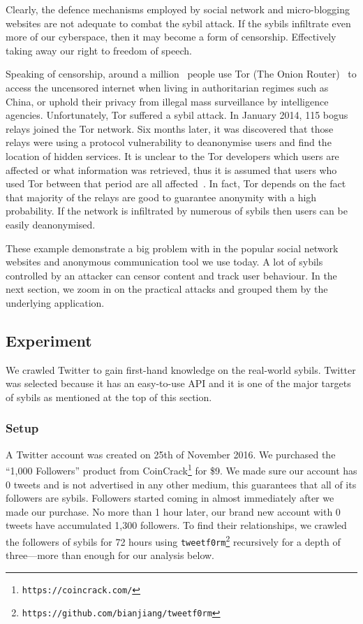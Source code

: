 Clearly, the defence mechanisms employed by social network and micro-blogging
websites are not adequate to combat the sybil attack. If the sybils infiltrate
even more of our cyberspace, then it may become a form of censorship.
Effectively taking away our right to freedom of speech.

Speaking of censorship, around a million~\cite{tormetric} people use Tor (The
Onion Router)~\cite{dingledine2004tor} to access the uncensored internet when
living in authoritarian regimes such as China, or uphold their privacy from
illegal mass surveillance by intelligence agencies. Unfortunately, Tor suffered
a sybil attack. In January 2014, 115 bogus relays joined the Tor network. Six months
later, it was discovered that those relays were using a protocol vulnerability
to deanonymise users and find the location of hidden services. It is unclear to
the Tor developers which users are affected or what information was retrieved,
thus it is assumed that users who used Tor between that period are all
affected~\cite{torsybil}. In fact, Tor depends on the fact that majority of the
relays are good to guarantee anonymity with a high probability. If the network
is infiltrated by numerous of sybils then users can be easily
deanonymised.

These example demonstrate a big problem with in the popular social network
websites and anonymous communication tool we use today. A lot of sybils
controlled by an attacker can censor content and track user behaviour. In the
next section, we zoom in on the practical attacks and grouped them by the
underlying application.

\subsection{Experiment}
We crawled Twitter to gain first-hand knowledge on the real-world sybils.
Twitter was selected because it has an easy-to-use API and it is one of the
major targets of sybils as mentioned at the top of this section.

\subsubsection{Setup}
A Twitter account was created on 25th of November 2016. We purchased the ``1,000
Followers'' product from CoinCrack\footnote{\texttt{https://coincrack.com/}} for
\$9. We made sure our account has 0 tweets and is not advertised in any other
medium, this guarantees that all of its followers are sybils. Followers started
coming in almost immediately after we made our purchase. No more than 1 hour
later, our brand new account with 0 tweets have accumulated 1,300 followers. To
find their relationships, we crawled the followers of sybils for 72 hours using
\verb!tweetf0rm!\footnote{\texttt{https://github.com/bianjiang/tweetf0rm}}
recursively for a depth of three---more than enough for our analysis below.

